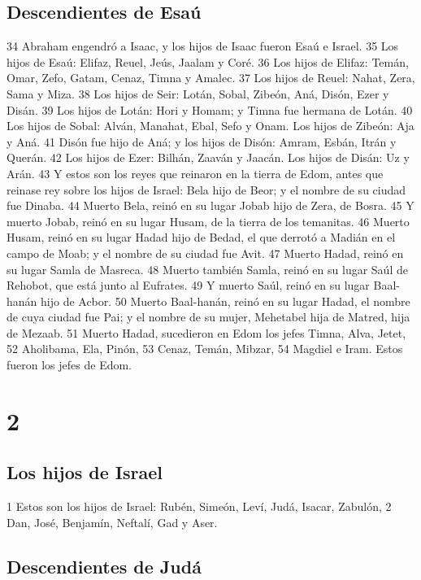 \section*{Descendientes de Esaú }

34 Abraham engendró a Isaac, y los hijos de Isaac fueron Esaú e Israel.
35 Los hijos de Esaú: Elifaz, Reuel, Jeús, Jaalam y Coré.
36 Los hijos de Elifaz: Temán, Omar, Zefo, Gatam, Cenaz, Timna y Amalec.
37 Los hijos de Reuel: Nahat, Zera, Sama y Miza.
38 Los hijos de Seir: Lotán, Sobal, Zibeón, Aná, Disón, Ezer y Disán.
39 Los hijos de Lotán: Hori y Homam; y Timna fue hermana de Lotán.
40 Los hijos de Sobal: Alván, Manahat, Ebal, Sefo y Onam. Los hijos de Zibeón: Aja y Aná.
41 Disón fue hijo de Aná; y los hijos de Disón: Amram, Esbán, Itrán y Querán.
42 Los hijos de Ezer: Bilhán, Zaaván y Jaacán. Los hijos de Disán: Uz y Arán.
43 Y estos son los reyes que reinaron en la tierra de Edom, antes que reinase rey sobre los hijos de Israel: Bela hijo de Beor; y el nombre de su ciudad fue Dinaba.
44 Muerto Bela, reinó en su lugar Jobab hijo de Zera, de Bosra.
45 Y muerto Jobab, reinó en su lugar Husam, de la tierra de los temanitas.
46 Muerto Husam, reinó en su lugar Hadad hijo de Bedad, el que derrotó a Madián en el campo de Moab; y el nombre de su ciudad fue Avit.
47 Muerto Hadad, reinó en su lugar Samla de Masreca.
48 Muerto también Samla, reinó en su lugar Saúl de Rehobot, que está junto al Eufrates.
49 Y muerto Saúl, reinó en su lugar Baal-hanán hijo de Acbor.
50 Muerto Baal-hanán, reinó en su lugar Hadad, el nombre de cuya ciudad fue Pai; y el nombre de su mujer, Mehetabel hija de Matred, hija de Mezaab.
51 Muerto Hadad, sucedieron en Edom los jefes Timna, Alva, Jetet,
52 Aholibama, Ela, Pinón,
53 Cenaz, Temán, Mibzar,
54 Magdiel e Iram. Estos fueron los jefes de Edom.

\chapter{2}

\section*{Los hijos de Israel}


1 Estos son los hijos de Israel: Rubén, Simeón, Leví, Judá, Isacar, Zabulón,
2 Dan, José, Benjamín, Neftalí, Gad y Aser.
\section*{Descendientes de Judá}

